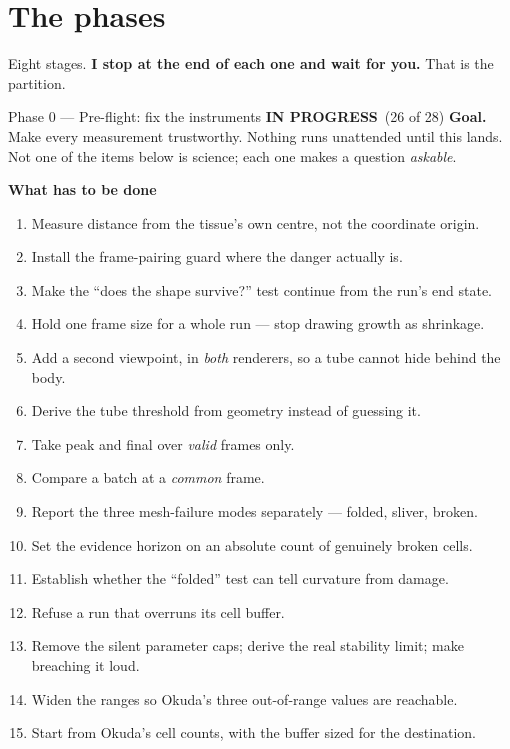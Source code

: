 \documentclass[11pt,a4paper]{article}
\newcommand{\prog}{\textcolor{warn}{\textbf{IN PROGRESS}}}
\begin{document}
\section{The phases}

Eight stages. \textbf{I stop at the end of each one and wait for you.} That is the partition.

\begin{phasebox}{Phase 0 --- Pre-flight: fix the instruments \hfill \prog\ (26 of 28)}
\textbf{Goal.} Make every measurement trustworthy. Nothing runs unattended until this lands.
Not one of the items below is science; each one makes a question \emph{askable}.

\textbf{What has to be done}
\begin{enumerate}[leftmargin=1.5em,itemsep=1pt]
\item Measure distance from the tissue's own centre, not the coordinate origin.
\item Install the frame-pairing guard where the danger actually is.
\item Make the ``does the shape survive?'' test continue from the run's end state.
\item Hold one frame size for a whole run --- stop drawing growth as shrinkage.
\item Add a second viewpoint, in \emph{both} renderers, so a tube cannot hide behind the body.
\item Derive the tube threshold from geometry instead of guessing it.
\item Take peak and final over \emph{valid} frames only.
\item Compare a batch at a \emph{common} frame.
\item Report the three mesh-failure modes separately --- folded, sliver, broken.
\item Set the evidence horizon on an absolute count of genuinely broken cells.
\item Establish whether the ``folded'' test can tell curvature from damage.
\item Refuse a run that overruns its cell buffer.
\item Remove the silent parameter caps; derive the real stability limit; make breaching it loud.
\item Widen the ranges so Okuda's three out-of-range values are reachable.
\item Start from Okuda's cell counts, with the buffer sized for the destination.

\end{enumerate}
\end{phasebox}
\end{document}
